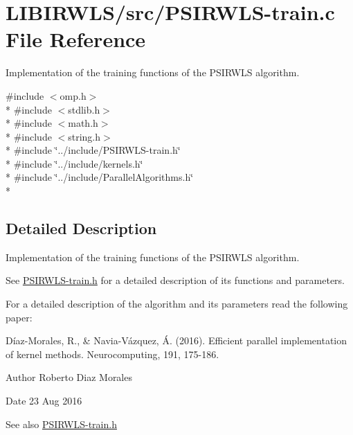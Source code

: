 \hypertarget{PSIRWLS-train_8c}{}\section{L\+I\+B\+I\+R\+W\+L\+S/src/\+P\+S\+I\+R\+W\+L\+S-\/train.c File Reference}
\label{PSIRWLS-train_8c}


Implementation of the training functions of the P\+S\+I\+R\+W\+LS algorithm.  


{\ttfamily \#include $<$omp.\+h$>$}\\*
{\ttfamily \#include $<$stdlib.\+h$>$}\\*
{\ttfamily \#include $<$math.\+h$>$}\\*
{\ttfamily \#include $<$string.\+h$>$}\\*
{\ttfamily \#include \char`\"{}../include/\+P\+S\+I\+R\+W\+L\+S-\/train.\+h\char`\"{}}\\*
{\ttfamily \#include \char`\"{}../include/kernels.\+h\char`\"{}}\\*
{\ttfamily \#include \char`\"{}../include/\+Parallel\+Algorithms.\+h\char`\"{}}\\*


\subsection{Detailed Description}
Implementation of the training functions of the P\+S\+I\+R\+W\+LS algorithm. 

See \hyperlink{PSIRWLS-train_8h}{P\+S\+I\+R\+W\+L\+S-\/train.\+h} for a detailed description of its functions and parameters.

For a detailed description of the algorithm and its parameters read the following paper\+:

Díaz-\/\+Morales, R., \& Navia-\/\+Vázquez, Á. (2016). Efficient parallel implementation of kernel methods. Neurocomputing, 191, 175-\/186.

\begin{DoxyAuthor}{Author}
Roberto Diaz Morales 
\end{DoxyAuthor}
\begin{DoxyDate}{Date}
23 Aug 2016 
\end{DoxyDate}
\begin{DoxySeeAlso}{See also}
\hyperlink{PSIRWLS-train_8h}{P\+S\+I\+R\+W\+L\+S-\/train.\+h} 
\end{DoxySeeAlso}
